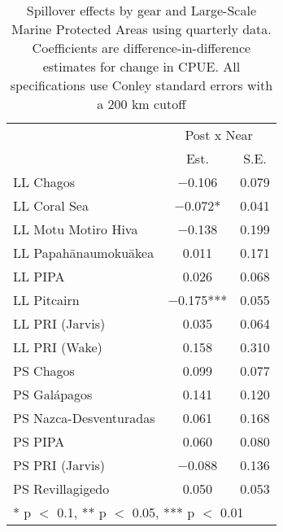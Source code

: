 \begin{table}

\caption{\label{tab:mpa_reg}Spillover effects by gear and Large-Scale Marine Protected Areas using quarterly data. Coefficients are
             difference-in-difference estimates for change in CPUE. All specifications use Conley standard errors with a 200 km cutoff}
\centering
\begin{tabular}[t]{lcc}
\toprule
\multicolumn{1}{c}{ } & \multicolumn{2}{c}{Post x Near} \\
\cmidrule(l{3pt}r{3pt}){2-3}
  & Est. & S.E.\\
\midrule
LL Chagos & \num{-0.106} & \num{0.079}\\
LL Coral Sea & \num{-0.072}* & \num{0.041}\\
LL Motu Motiro Hiva & \num{-0.138} & \num{0.199}\\
LL Papahānaumokuākea & \num{0.011} & \num{0.171}\\
LL PIPA & \num{0.026} & \num{0.068}\\
LL Pitcairn & \num{-0.175}*** & \num{0.055}\\
LL PRI (Jarvis) & \num{0.035} & \num{0.064}\\
LL PRI (Wake) & \num{0.158} & \num{0.310}\\
PS Chagos & \num{0.099} & \num{0.077}\\
PS Galápagos & \num{0.141} & \num{0.120}\\
PS Nazca-Desventuradas & \num{0.061} & \num{0.168}\\
PS PIPA & \num{0.060} & \num{0.080}\\
PS PRI (Jarvis) & \num{-0.088} & \num{0.136}\\
PS Revillagigedo & \num{0.050} & \num{0.053}\\
\bottomrule
\multicolumn{3}{l}{\rule{0pt}{1em}* p $<$ 0.1, ** p $<$ 0.05, *** p $<$ 0.01}\\
\end{tabular}
\end{table}
